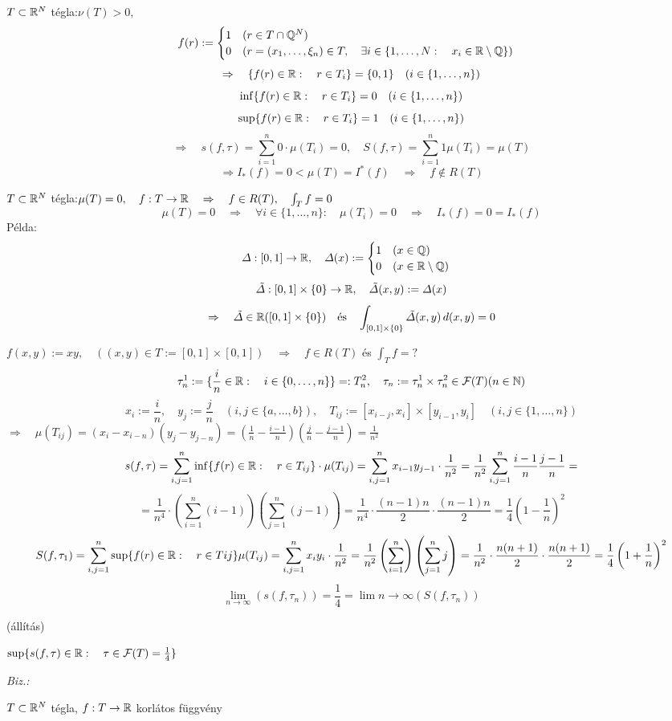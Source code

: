 \documentclass[a4paper,11.5pt]{article}
\begin{document}
	\begin{example}
		$T\subset\mathbb{R}^N$ tégla:\quad $\nu(T)>0,$
		\[ f(r):=
		\begin{cases}
			1\quad (r\in T\cap\mathbb{Q}^N)\\
			0\quad (r=(x_1,\ldots,\xi_n)\in T,\quad \exists i\in\{1,\ldots,N:\quad x_i\in\mathbb{R}\setminus \mathbb{Q}\})
		\end{cases}
		\]
		\[ \Rightarrow\quad \{ f(r)\in\mathbb{R}:\quad r\in T_i \}=\{0,1\}\quad (i\in\{1,\ldots,n\}) \]
		\[ \inf\{ f(r)\in\mathbb{R}:\quad r\in T_i \}=0\quad (i\in\{1,\ldots,n\}) \]
		\[ \sup\{ f(r)\in\mathbb{R}:\quad r\in T_i \}=1\quad (i\in\{1,\ldots,n\}) \]
		\[ \Rightarrow\quad s(f,\tau)=\sum_{i=1}^n0\cdot\mu(T_i)=0,\quad S(f,\tau)=\sum_{i=1}^n1\mu(T_i)=\mu(T) \]
		\[ \Rightarrow I_*(f)=0<\mu(T)=I^*(f)\quad \Rightarrow\quad f\notin R(T) \]
	\end{example}
	\begin{example}
		$T\subset\mathbb{R}^N$ tégla:\quad $\mu(T)=0,\quad f:T\to\mathbb{R} \quad \Rightarrow\quad f\in R(T),\quad \int_Tf=0$
		\[ \mu(T)=0\quad \Rightarrow\quad \forall i\in\{1,\ldots,n\}:\quad \mu(T_i)=0\quad \Rightarrow\quad I_*(f)=0=I_*(f) \]
		Példa:\[ \varDelta:[0,1]\to\mathbb{R},\quad \varDelta(x):=\begin{cases}
			1\quad (x\in\mathbb{Q})\\
			0\quad (x\in\mathbb{R}\setminus\mathbb{Q})
		\end{cases} \]
		\[ \tilde{\varDelta}:[0,1]\times\{0\}\to\mathbb{R},\quad \tilde{\varDelta}(x,y):=\varDelta(x) \]
		\[ \Rightarrow\quad \tilde{\varDelta}\in\mathbb{R}([0,1]\times\{0\})\text{\quad és\quad }\int_{[0,1]\times\{0\}}\tilde{\varDelta}(x,y)\,d(x,y)=0 \]
	\end{example}
	\begin{task}
		$f(x,y):=xy,\quad ((x,y)\in T:=[0,1]\times[0,1])\quad \Rightarrow\quad f\in R(T)$ és $\int_T f=?$
		\[ \tau_n^1:=\{ \frac{i}{n}\in\mathbb{R}:\quad i\in\{0,\ldots,n\} \}=:T_n^2,\quad \tau_n:=\tau_n^1\times\tau_n^2\in\mathcal{F}(T)(n\in\mathbb{N}) \]
		\[ x_i:=\frac{i}{n},\quad y_j:=\frac{j}{n}\quad (i,j\in\{a,\ldots,b\}),\quad T_{ij}:=[x_{i-j},x_i]\times[y_{i-1},y_i] \quad (i,j\in\{1,\ldots,n\}) \]
		$\Rightarrow\quad \mu(T_{ij})=(x_i-x_{i-n})(y_j-y_{j-n})=\left(\frac{1}{n}-\frac{i-1}{n}\right)\left(\frac{j}{n}-\frac{j-1}{n}\right)=\frac{1}{n^2}$
		\[ s(f,\tau)=\sum_{i,j=1}^n\inf\{ f(r)\in\mathbb{R}:\quad r\in T_{ij} \}\cdot\mu (T_{ij})=\sum_{i,j=1}^nx_{i-1}y_{j-1}\cdot\frac{1}{n^2}=\frac{1}{n^2}\sum_{i,j=1}^n\frac{i-1}{n}\frac{j-1}{n}=\]
		\[=\frac{1}{n^4}\cdot\left(\sum_{i=1}^n(i-1)\right)\left(\sum_{j=1}^n(j-1)\right)=\frac{1}{n^4}\cdot\frac{(n-1)n}{2}\cdot\frac{(n-1)n}{2}=\frac{1}{4}\left(1-\frac{1}{n}\right)^2 \]
		\[ S(f,\tau_1)=\sum_{i,j=1}^n\sup\{ f(r)\in\mathbb{R}:\quad r\in T{ij} \}\mu(T_{ij})=\sum_{i,j=1}^nx_iy_i\cdot\frac{1}{n^2}=\frac{1}{n^2}\left(\sum_{i=1}^n\right)\left(\sum_{j=1}^nj\right)=\frac{1}{n^2}\cdot\frac{n(n+1)}{2}\cdot\frac{n(n+1)}{2}=\frac{1}{4}\left(1+\frac{1}{n}\right)^2 \]
		\[ \lim_{n\to\infty}(s(f,\tau_n))=\frac{1}{4}=\lim{n\to\infty}(S(f,\tau_n)) \]
	\end{task}
	\begin{theorem}
		(állítás)
		
		$\sup\{ s(f,\tau)\in\mathbb{R}:\quad \tau\in\mathcal{F}(T)=\frac{1}{4} \}$
		
		\textit{Biz.:}
		
	\end{theorem}
	\begin{theorem}
		$T\subset\mathbb{R}^N$ tégla, $f:T\to\mathbb{R}$ korlátos függvény %
	\end{theorem}
\end{document}
